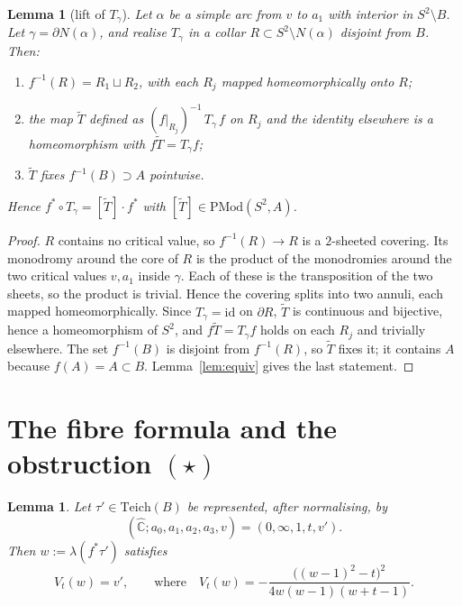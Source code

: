 \documentclass[11pt]{article}
\newtheorem{lemma}[proposition]{Lemma}
\theoremstyle{definition}
\newcommand{\Teich}{\mathrm{Teich}}
\newcommand{\PMod}{\mathrm{PMod}}
\newcommand{\Ch}{\hat{\mathbb C}}
\begin{document}
\begin{lemma}[lift of $T_\gamma$]\label{lem:lift}
Let $\alpha$ be a simple arc from $v$ to $a_1$ with interior in $S^2\setminus B$. Let $\gamma=\partial N(\alpha)$, and realise $T_\gamma$ in a collar $R\subset S^2\setminus N(\alpha)$ disjoint from $B$. Then:
\begin{enumerate}[label=\textup{(\roman*)},nosep]
\item $f^{-1}(R)=R_1\sqcup R_2$, with each $R_j$ mapped homeomorphically onto $R$;
\item the map $\tilde T$ defined as $(f|_{R_j})^{-1}\,T_\gamma\, f$ on $R_j$ and the identity elsewhere is a homeomorphism with $f\tilde T=T_\gamma f$;
\item $\tilde T$ fixes $f^{-1}(B)\supset A$ pointwise.
\end{enumerate}
Hence $f^*\circ T_\gamma=[\tilde T]\cdot f^*$ with $[\tilde T]\in\PMod(S^2,A)$.
\end{lemma}

\begin{proof}
$R$ contains no critical value, so $f^{-1}(R)\to R$ is a $2$-sheeted covering. Its monodromy around the core of $R$ is the product of the monodromies around the two critical values $v,a_1$ inside $\gamma$. Each of these is the transposition of the two sheets, so the product is trivial. Hence the covering splits into two annuli, each mapped homeomorphically. Since $T_\gamma=\mathrm{id}$ on $\partial R$, $\tilde T$ is continuous and bijective, hence a homeomorphism of $S^2$, and $f\tilde T=T_\gamma f$ holds on each $R_j$ and trivially elsewhere. The set $f^{-1}(B)$ is disjoint from $f^{-1}(R)$, so $\tilde T$ fixes it; it contains $A$ because $f(A)=A\subset B$. Lemma~\ref{lem:equiv} gives the last statement.
\end{proof}

\section{The fibre formula and the obstruction \texorpdfstring{$(\star)$}{(*)}}

\begin{lemma}\label{lem:fibreformula}
Let $\tau'\in\Teich(B)$ be represented, after normalising, by
\[(\Ch;a_0,a_1,a_2,a_3,v)=(0,\infty,1,t,v').\] Then $w:=\lambda(f^*\tau')$ satisfies
\[V_t(w)=v',\qquad\text{where}\quad V_t(w)=-\frac{\bigl((w-1)^2-t\bigr)^2}{4w(w-1)(w+t-1)} .\]
\end{lemma}

\end{document}
